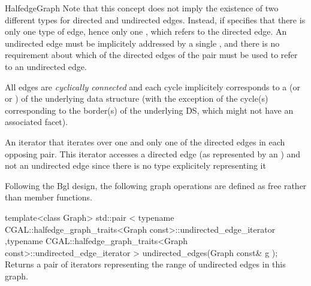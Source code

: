 \begin{ccRefConcept}{HalfedgeGraph}
Note that this concept does not imply the existence of two different types
for directed and undirected edges. Instead, if specifies that there is only one type of edge,
hence only one , which refers to the directed edge.
An undirected edge must be implicitely addressed by a single ,
and there is no requirement about which of the directed edges of the pair must
be used to refer to an undirected edge.

All edges are {\em cyclically connected} and each cycle implicitely
corresponds to a  (or  or ) of the
underlying data structure (with the exception of the cycle(s)
corresponding to the border(s) of the underlying DS, which might not
have an associated facet).


\ccRefines
{}

\ccTypes
  {An iterator that iterates over one and only one of the directed edges
  in each opposing pair. This iterator accesses a directed edge 
  (as represented by an ) and not an undirected edge 
  since there is no type explicitely representing it}{}
  
\ccOperations

Following the {\sc Bgl} design, the following graph operations are defined as free rather than member functions.

  \ccFunction
  {template<class Graph>
  std::pair < typename CGAL::halfedge_graph_traits<Graph const>::undirected_edge_iterator
             ,typename CGAL::halfedge_graph_traits<Graph const>::undirected_edge_iterator
             >   
  undirected_edges(Graph const& g );
  }
  {Returns a pair of iterators representing the range \ccc{[begin,end)} 
  of undirected edges in this graph.}

\ccHasModels
{}\\
\\

\end{ccRefConcept}

